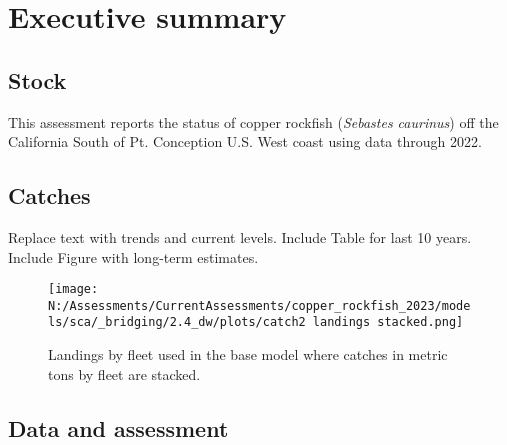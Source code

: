 \documentclass[11pt,
  english,
  letterpaper,
]{article}
\begin{document}
\newcommand{\lt}{\ensuremath <}
\newcommand{\gt}{\ensuremath >}

\pagebreak
{}
\setcounter{page}{1}

\renewcommand{\thetable}{\roman{table}}
\renewcommand{\thefigure}{\roman{figure}}

\setlength\parskip{0.5em plus 0.1em minus 0.2em}

\hypertarget{executive-summary}{%
\section*{Executive summary}\label{executive-summary}}

\hypertarget{stock}{%
\subsection*{Stock}\label{stock}}

This assessment reports the status of copper rockfish (\emph{Sebastes caurinus}) off the California South of Pt. Conception U.S. West coast using data through 2022.

\hypertarget{catches}{%
\subsection*{Catches}\label{catches}}

Replace text with trends and current levels. Include Table for last 10 years. Include Figure with long-term estimates.



\begin{figure}
\centering
\texttt{[image: N:/Assessments/CurrentAssessments/copper\_rockfish\_2023/models/sca/\_bridging/2.4\_dw/plots/catch2 landings stacked.png]}
\caption{Landings by fleet used in the base model where catches in metric tons by fleet are stacked.\label{fig:es-catch}}
\end{figure}

\hypertarget{data-and-assessment}{%
\subsection*{Data and assessment}\label{data-and-assessment}}
\end{document}
